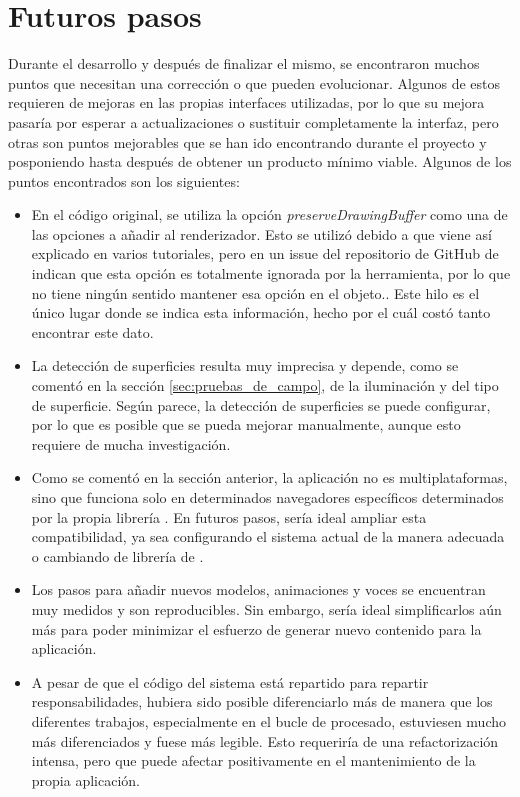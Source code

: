 \documentclass{subfiles}
\begin{document}
    \section{Futuros pasos}
    \label{sec:futuros_pasos}
    Durante el desarrollo y después de finalizar el mismo, se encontraron muchos puntos que necesitan una corrección o que pueden evolucionar. Algunos de estos requieren de mejoras en las propias interfaces utilizadas, por lo que su mejora pasaría por esperar a actualizaciones o sustituir completamente la interfaz, pero otras son puntos mejorables que se han ido encontrando durante el proyecto y posponiendo hasta después de obtener un producto mínimo viable. Algunos de los puntos encontrados son los siguientes:
    \begin{itemize}
        \item En el código original, se utiliza la opción \textit{preserveDrawingBuffer} como una de las opciones a añadir al renderizador. Esto se utilizó debido a que viene así explicado en varios tutoriales, pero en un issue del repositorio de GitHub de \webxr indican que esta opción es totalmente ignorada por la herramienta, por lo que no tiene ningún sentido mantener esa opción en el objeto.\cite{web:webxr_github_preserveDrawingBuffer}. Este hilo es el único lugar donde se indica esta información, hecho por el cuál costó tanto encontrar este dato.
        \item La detección de superficies resulta muy imprecisa y depende, como se comentó en la sección \ref{sec:pruebas_de_campo}, de la iluminación y del tipo de superficie. Según parece, la detección de superficies se puede configurar, por lo que es posible que se pueda mejorar manualmente, aunque esto requiere de mucha investigación.
        \item Como se comentó en la sección anterior, la aplicación no es multiplataformas, sino que funciona solo en determinados navegadores específicos determinados por la propia librería \webxr. En futuros pasos, sería ideal ampliar esta compatibilidad, ya sea configurando el sistema actual de la manera adecuada o cambiando de librería de \ra.
        \item Los pasos para añadir nuevos modelos, animaciones y voces se encuentran muy medidos y son reproducibles. Sin embargo, sería ideal simplificarlos aún más para poder minimizar el esfuerzo de generar nuevo contenido para la aplicación.
        \item A pesar de que el código del sistema está repartido para repartir responsabilidades, hubiera sido posible diferenciarlo más de manera que los diferentes trabajos, especialmente en el bucle de procesado, estuviesen mucho más diferenciados y fuese más legible. Esto requeriría de una refactorización intensa, pero que puede afectar positivamente en el mantenimiento de la propia aplicación.

\end{itemize}
\end{document}
